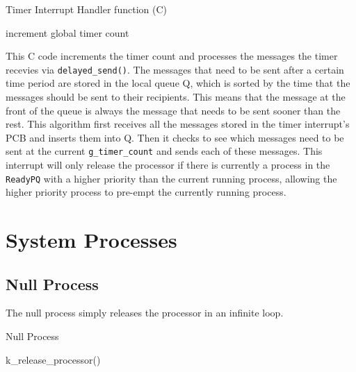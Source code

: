 \documentclass[12pt]{report}
\begin{document}
\begin{algorithm}[H]
	\caption{Timer Interrupt Handler function (C)}
	\begin{algorithmic}[1]
	    \State increment global timer count
			\EndIf
		\EndWhile
		\EndWhile
		\EndIf
	  \EndFunction
	\end{algorithmic}
\end{algorithm}

This C code increments the timer count and processes the messages the timer recevies via \texttt{delayed\_send()}.  The messages that need to be sent after a certain time period are stored in the local queue Q, which is sorted by the time that the messages should be sent to their recipients.  This means that the message at the front of the queue is always the message that needs to be sent sooner than the rest.  This algorithm first receives all the messages stored in the timer interrupt's PCB and inserts them into Q.  Then it checks to see which messages need to be sent at the current \texttt{g_timer_count} and sends each of these messages.  This interrupt will only release the processor if there is currently a process in the \texttt{ReadyPQ} with a higher priority than the current running process, allowing the higher priority process to pre-empt the currently running process.


\section{System Processes}

\subsection{Null Process}

The null process simply releases the processor in an infinite loop.

\begin{algorithm}[H]
	\caption{Null Process}
	\begin{algorithmic}[1]
				\State k_release_processor()
			\EndWhile
		\EndFunction		
	\end{algorithmic}
\end{algorithm}
\end{document}
